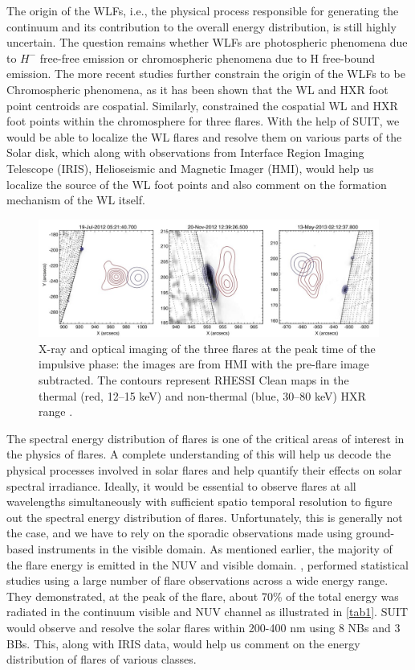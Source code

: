 {The origin of the WLFs, i.e., the physical process responsible for generating the continuum and its contribution to the overall energy distribution, is still highly uncertain. The question remains whether WLFs are photospheric phenomena due to $H^{-}$ free-free emission or chromospheric phenomena due to H free-bound emission. The more recent studies further constrain the origin of the WLFs to be Chromospheric phenomena, as it has been shown that the WL and HXR foot point centroids are cospatial. Similarly, \cite{krucker15} constrained the cospatial WL and HXR foot points within the chromosphere for three flares. With the help of SUIT, we would be able to localize the WL flares and resolve them on various parts of the Solar disk, which along with observations from Interface Region Imaging Telescope (IRIS), Helioseismic and Magnetic Imager (HMI), would help us localize the source of the WL foot points and also comment on the formation mechanism of the WL itself.

\begin{figure}[ht!]
    \centering
    \includegraphics[width = \linewidth]{Figures/Krucker_2015_ApJ_802_19_page-0004.jpg}
    \caption{X-ray and optical imaging of the three flares at the peak time of the impulsive phase: the images are from HMI with the pre-flare image subtracted. The contours represent RHESSI Clean maps in the thermal (red, 12–15 keV) and non-thermal (blue, 30–80 keV) HXR range \citep{krucker15}.}
    \label{fig1}
\end{figure}

The spectral energy distribution of flares is one of the critical areas of interest in the physics of flares. A complete understanding of this will help us decode the physical processes involved in solar flares and help quantify their effects on solar spectral irradiance. Ideally, it would be essential to observe flares at all wavelengths simultaneously with sufficient spatio temporal resolution to figure out the spectral energy distribution of flares. Unfortunately, this is generally not the case, and we have to rely on the sporadic observations made using ground-based instruments in the visible domain. As mentioned earlier, the majority of the flare energy is emitted in the NUV and visible domain. \cite{kretzschmar10,kretzschmar11}, performed statistical studies using a large number of flare observations across a wide energy range. They demonstrated, at the peak of the flare, about 70\% of the total energy was radiated in the continuum visible and NUV channel as illustrated in \ref{tab1}. SUIT would observe and resolve the solar flares within 200-400 nm using 8 NBs and 3 BBs. This, along with IRIS data, would help us comment on the energy distribution of flares of various classes.

}
